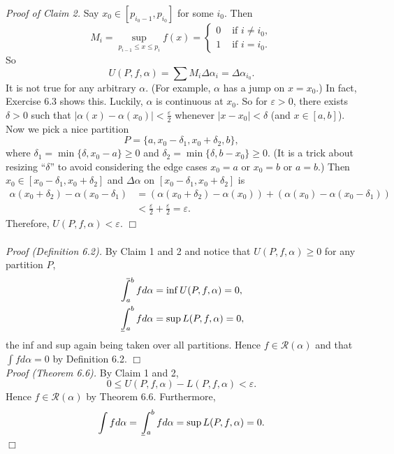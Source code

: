 \documentclass{article}
\def\upint{\mathchoice%
    {\mkern13mu\overline{\vphantom{\intop}\mkern7mu}\mkern-20mu}%
    {\mkern7mu\overline{\vphantom{\intop}\mkern7mu}\mkern-14mu}%
    {\mkern7mu\overline{\vphantom{\intop}\mkern7mu}\mkern-14mu}%
    {\mkern7mu\overline{\vphantom{\intop}\mkern7mu}\mkern-14mu}%
  \int}
\def\lowint{\mkern3mu\underline{\vphantom{\intop}\mkern7mu}\mkern-10mu\int}
\begin{document}
\emph{Proof of Claim 2.}
Say $x_0 \in [p_{i_0 - 1}, p_{i_0}]$ for some $i_0$.
Then
\begin{equation*}
  M_i = \sup_{p_{i - 1} \leq x \leq p_i} f(x) =
    \begin{cases}
      0 & \text{ if $i \neq i_0$}, \\
      1 & \text{ if $i = i_0$}.
    \end{cases}
\end{equation*}
So
$$U(P, f, \alpha) = \sum M_i \Delta \alpha_i = \Delta \alpha_{i_0}.$$
It is not true for any arbitrary $\alpha$. (For example, $\alpha$ has a jump on $x = x_0$.)
In fact, Exercise 6.3 shows this.
Luckily, $\alpha$ is continuous at $x_0$. So for $\varepsilon > 0$,
there exists $\delta > 0$ such that $|\alpha(x) - \alpha(x_0)| < \frac{\varepsilon}{2}$
whenever $|x - x_0| < \delta$ (and $x \in [a, b]$).
Now we pick a nice partition
$$P = \{ a, x_0 - \delta_1, x_0 + \delta_2, b \},$$
where $\delta_1 = \min\{\delta, x_0 - a\} \geq 0$
and $\delta_2 = \min\{\delta, b - x_0\} \geq 0$.
(It is a trick about resizing ``$\delta$''
to avoid considering the edge cases $x_0 = a$ or $x_0 = b$ or $a = b$.)
Then $x_0 \in [x_0 - \delta_1, x_0 + \delta_2]$
and $\Delta \alpha$ on $[x_0 - \delta_1, x_0 + \delta_2]$ is
\begin{align*}
\alpha(x_0 + \delta_2) - \alpha(x_0 - \delta_1)
&= (\alpha(x_0 + \delta_2) - \alpha(x_0)) + (\alpha(x_0) - \alpha(x_0 - \delta_1)) \\
&< \frac{\varepsilon}{2} + \frac{\varepsilon}{2} = \varepsilon.
\end{align*}
Therefore, $U(P, f, \alpha) < \varepsilon$.
$\Box$ \\\\



\emph{Proof (Definition 6.2).}
By Claim 1 and 2 and notice that $U(P, f, \alpha) \geq 0$ for any partition $P$,
\begin{align*}
\upint_a^b f d\alpha &= \inf U(P, f, \alpha) = 0, \\
\lowint_a^b f d\alpha &= \sup L(P, f, \alpha) = 0,
\end{align*}
the inf and sup again being taken over all partitions.
Hence $f \in \mathscr{R}(\alpha)$ and that $\int f d \alpha = 0$ by Definition 6.2.
$\Box$ \\

\emph{Proof (Theorem 6.6).}
By Claim 1 and 2,
$$0 \leq U(P, f, \alpha) - L(P, f, \alpha) < \varepsilon.$$
Hence $f \in \mathscr{R}(\alpha)$ by Theorem 6.6.
Furthermore,
$$\int f d \alpha = \lowint_a^b f d\alpha = \sup L(P, f, \alpha) = 0.$$
$\Box$ \\
\end{document}
